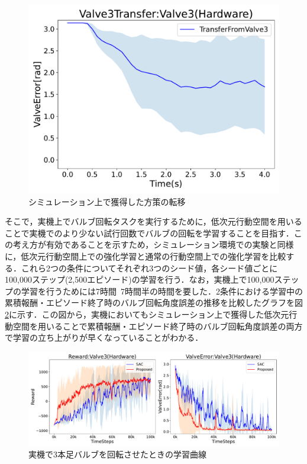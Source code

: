 \documentclass[dvipdfmx]{ampbt_nomag}
\begin{document}
\begin{figure}[htbp]
  \centering
  \includegraphics[width=16cm]
       {asset/img/HardwareTurn180Valve3Transfer.pdf}
  \caption{シミュレーション上で獲得した方策の転移}
  \label{ValveTrajectory_Valve3_Hardware}
\end{figure}

そこで，実機上でバルブ回転タスクを実行するために，低次元行動空間を用いることで実機でのより少ない試行回数でバルブの回転を学習することを目指す．この考え方が有効であることを示すため，シミュレーション環境での実験と同様に，低次元行動空間上での強化学習と通常の行動空間上での強化学習を比較する．これら2つの条件についてそれぞれ3つのシード値，各シード値ごとに100,000ステップ(2,500エピソード)の学習を行う．なお，実機上で100,000ステップの学習を行うためには7時間~7時間半の時間を要した．2条件における学習中の累積報酬・エピソード終了時のバルブ回転角度誤差の推移を比較したグラフを図\ref{LearningCurve_HardwareTurn180}に示す．この図から，実機においてもシミュレーション上で獲得した低次元行動空間を用いることで累積報酬・エピソード終了時のバルブ回転角度誤差の両方で学習の立ち上がりが早くなっていることがわかる．



\begin{figure}[htbp]
  \centering
  \includegraphics[width=16cm]
       {asset/img/HardwareTurn180Valve3.pdf}
  \caption{実機で3本足バルブを回転させたときの学習曲線}
  \label{LearningCurve_HardwareTurn180}
\end{figure}
\end{document}

